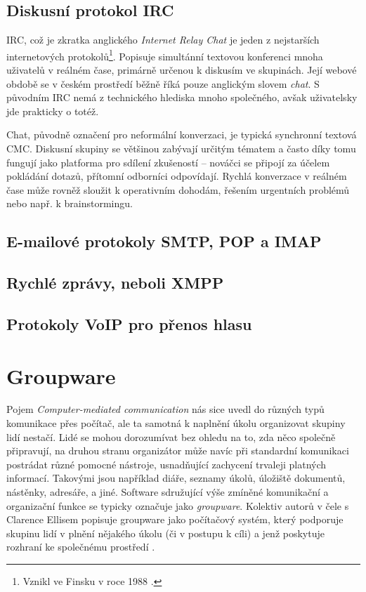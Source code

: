 \documentclass[12pt,oneside,final]{fithesis2}
\begin{document}
\subsection{Diskusní protokol IRC}\label{irc}
IRC, což je zkratka anglického {\it Internet Relay Chat} je jeden z nejstarších internetových protokolů\footnote{Vznikl ve Finsku v roce 1988 \cite{oikarinen2011founding}.}. Popisuje simultánní textovou konferenci mnoha uživatelů v reálném čase, primárně určenou k diskusím ve skupinách. Její webové obdobě se v českém prostředí běžně říká pouze anglickým slovem {\it chat}. S původním IRC nemá z technického hlediska mnoho společného, avšak uživatelsky jde prakticky o totéž.

Chat, původně označení pro neformální konverzaci, je typická synchronní textová CMC. Diskusní skupiny se většinou zabývají určitým tématem a často díky tomu fungují jako platforma pro sdílení zkušeností -- nováčci se připojí za účelem pokládání dotazů, přítomní odborníci odpovídají. Rychlá konverzace v reálném čase může rovněž sloužit k operativním dohodám, řešením urgentních problémů nebo např. k brainstormingu.

\subsection{E-mailové protokoly SMTP, POP a IMAP}\label{email}

\subsection{Rychlé zprávy, neboli XMPP}\label{xmpp}

\subsection{Protokoly VoIP pro přenos hlasu}\label{voip}

\section{Groupware}
Pojem {\it Computer-mediated communication} nás sice uvedl do různých typů komunikace přes počítač, ale ta samotná k naplnění úkolu organizovat skupiny lidí nestačí. Lidé se mohou dorozumívat bez ohledu na to, zda něco společně připravují, na druhou stranu organizátor může navíc při standardní komunikaci postrádat různé pomocné nástroje, usnadňující zachycení trvaleji platných informací. Takovými jsou například diáře, seznamy úkolů, úložiště dokumentů, nástěnky, adresáře, a jiné. Software sdružující výše zmíněné komunikační a organizační funkce se typicky označuje jako {\it groupware}. Kolektiv autorů v čele s Clarence Ellisem popisuje groupware jako počítačový systém, který podporuje skupinu lidí v plnění nějakého úkolu (či v postupu k cíli) a jenž poskytuje rozhraní ke společnému prostředí \cite{ellis1991groupware}.
\end{document}
